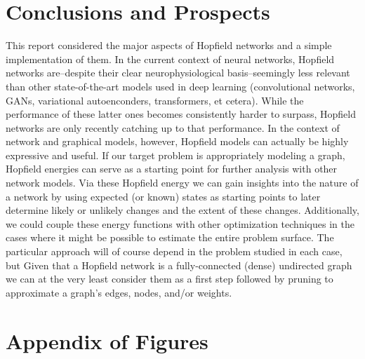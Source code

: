 \documentclass[11pt]{article}
\begin{document}
	\section{Conclusions and Prospects}
	This report considered the major aspects of Hopfield networks and a simple implementation of them. 
	In the current context of neural networks, Hopfield networks are–despite their clear neurophysiological basis–seemingly less relevant than other state-of-the-art models used in deep learning (convolutional networks, GANs, variational autoenconders, transformers, et cetera). While the performance of these latter ones becomes consistently harder to surpass, Hopfield networks are only recently catching up to that performance.
	In the context of network and graphical models, however, Hopfield models can actually be highly expressive and useful.
	If our target problem is appropriately modeling a graph, Hopfield energies can serve as a starting point for further analysis with other network models.
	 Via these Hopfield energy we can gain insights into the nature of a network by using expected (or known) states as starting points to later determine likely or unlikely changes and the extent of these changes. 
	 Additionally, we could couple these energy functions with other optimization techniques in the cases where it might be possible to estimate the entire problem surface. 
	 The particular approach will of course depend in the problem studied in each case, but Given that a Hopfield network is a fully-connected (dense) undirected graph we can at the very least consider them as a first step followed by pruning to approximate a graph's edges, nodes, and/or weights.

	\pagebreak
	\printbibliography[title={References}]
	
	\pagebreak
	\section*{Appendix of Figures}
	
\end{document}
